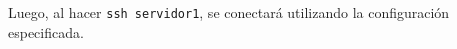 Luego, al hacer \texttt{ssh servidor1}, se conectará utilizando la configuración especificada.









